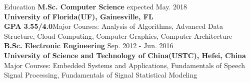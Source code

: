 \documentclass{resume} %
\begin{document}
\vspace{-1.5em}


\begin{rSection}{Education}
{\bf M.Sc. Computer Science} \hfill {expected May. 2018}\\
{\bf University of Florida(UF), Gainesville, FL}\\
{\bf GPA 3.55/4.0}{\qquad Major Courses: Analysis of Algorithms, Advanced Data Structure, Cloud Computing, Computer Graphics, Computer Architecture}\vspace{0.4em}\\
{\bf B.Sc. Electronic Engineering  } \hfill { Sep. 2012 - Jun. 2016} \\
{\bf University of Science and Technology of China(USTC), Hefei, China} \\
{\qquad Major Courses: Embedded Systems and Applications, Fundamentals of Speech Signal Processing, Fundamentals of Signal Statistical Modeling}
\end{rSection}


\end{document}
